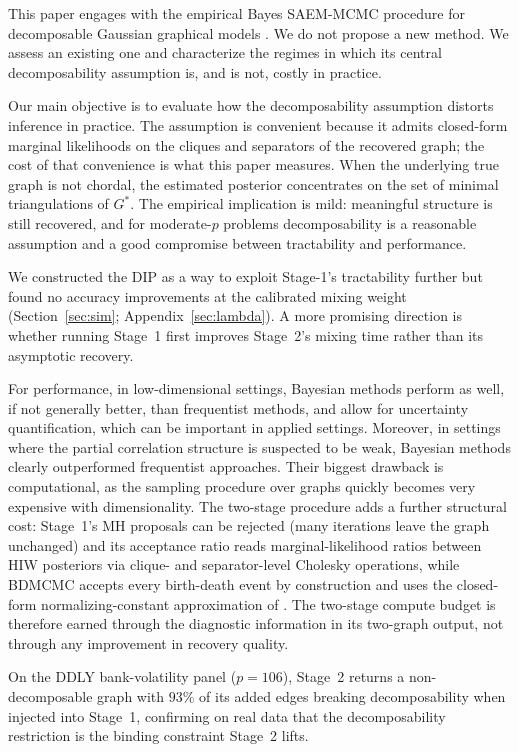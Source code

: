 This paper engages with the empirical Bayes SAEM-MCMC procedure for decomposable Gaussian graphical models \parencite{donnet2012empirical}. We do not propose a new method. We assess an existing one and characterize the regimes in which its central decomposability assumption is, and is not, costly in practice.

Our main objective is to evaluate how the decomposability assumption distorts inference in practice. The assumption is convenient because it admits closed-form marginal likelihoods on the cliques and separators of the recovered graph; the cost of that convenience is what this paper measures. When the underlying true graph is not chordal, the estimated posterior concentrates on the set of minimal triangulations of $G^*$. The empirical implication is mild: meaningful structure is still recovered, and for moderate-$p$ problems decomposability is a reasonable assumption and a good compromise between tractability and performance.

We constructed the DIP as a way to exploit Stage-1's tractability further but found no accuracy improvements at the calibrated mixing weight (Section~\ref{sec:sim}; Appendix~\ref{sec:lambda}). A more promising direction is whether running Stage~1 first improves Stage~2's mixing time rather than its asymptotic recovery.

For performance, in low-dimensional settings, Bayesian methods perform as well, if not generally better, than frequentist methods, and allow for uncertainty quantification, which can be important in applied settings. Moreover, in settings where the partial correlation structure is suspected to be weak, Bayesian methods clearly outperformed frequentist approaches. Their biggest drawback is computational, as the sampling procedure over graphs quickly becomes very expensive with dimensionality. The two-stage procedure adds a further structural cost: Stage~1's MH proposals can be rejected (many iterations leave the graph unchanged) and its acceptance ratio reads marginal-likelihood ratios between HIW posteriors via clique- and separator-level Cholesky operations, while BDMCMC accepts every birth-death event by construction and uses the closed-form normalizing-constant approximation of \textcite{mohammadi2023accelerating}. The two-stage compute budget is therefore earned through the diagnostic information in its two-graph output, not through any improvement in recovery quality.

On the DDLY bank-volatility panel ($p = 106$), Stage~2 returns a non-decomposable graph with $93\%$ of its added edges breaking decomposability when injected into Stage~1, confirming on real data that the decomposability restriction is the binding constraint Stage~2 lifts.

